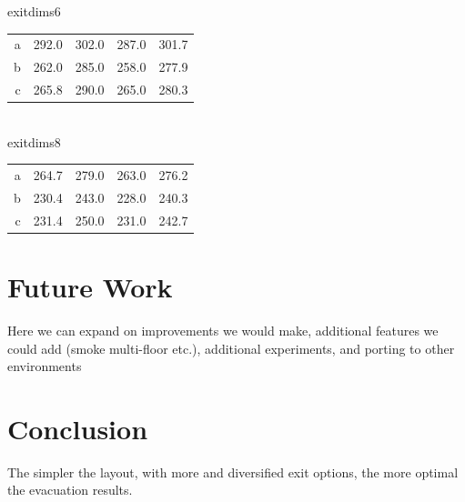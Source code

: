 \documentclass[12pt,letterpaper]{article}
\begin{document}
exitdims6
\begin{tabular}{ r | r | r | r | r }
a & 292.0 & 302.0 & 287.0 & 301.7 \\
b & 262.0 & 285.0 & 258.0 & 277.9 \\
c & 265.8 & 290.0 & 265.0 & 280.3 \\
\end{tabular}
\\
exitdims8
\begin{tabular}{ r | r | r | r | r }
a& 264.7& 279.0& 263.0& 276.2 \\
b& 230.4& 243.0& 228.0& 240.3 \\
c& 231.4& 250.0& 231.0& 242.7 \\
\end{tabular}

\section{Future Work}
Here we can expand on improvements we would make, additional features we could add (smoke multi-floor etc.), additional experiments, and porting to other environments
\section {Conclusion}

The simpler the layout, with more and diversified exit options, the more optimal
the evacuation results.




\end{document}
